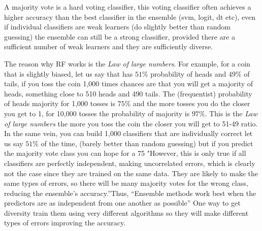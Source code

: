 \documentclass[12pt]{report}
\begin{document}
A majority vote is a hard voting classifier, this voting classifier often achieves a higher accuracy than the best classifier in the ensemble (svm, logit, dt etc), even if individual classifiers are weak learners (do slightly better than random guessing) the ensemble can still be a strong classifier, provided there are a sufficient number of weak learners and they are sufficiently diverse. %

The reason why RF works is the \emph{Law of large numbers}. For example, for a coin that is slightly biased, let us say that has $51\%$ probability of heads and $49\%$ of tails, if you toss the coin 1,000 times chances are that you will get a majority  of heads, something close to 510 heads and 490 tails. The (frequentist) probability of heads majority for 1,000 tosses is $75\%$ and the more tosses you do the closer you get to 1, for 10,000 tosses the probability of majority is $97\%$. This is the \emph{Law of large numbers} the more you toss the coin the closer you will get to 51-49 ratio. In the same vein, you can build 1,000 classifiers that are individually correct let us say $51\%$ of the time, (barely better than random guessing) but if you predict the majority vote class you can hope for a 75%
"However, this is only true if all classifiers are perfectly independent, making uncorrelated errors, which is clearly not the case since they are trained on the same data. They are likely to make the same types of errors, so there will be many majority votes for the wrong class, reducing the ensemble’s accuracy.”Thus, “Ensemble methods work best when the predictors are as independent from one another as possible” One way to get diversity train them using very different algorithms so they will make different types of errors improving the accuracy.

\end{document}
